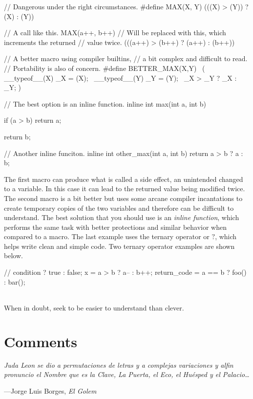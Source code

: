 \documentclass[11pt]{article}
\begin{document}
\begin{codelisting}{}
// Dangerous under the right circumstances.
#define MAX(X, Y) (((X) > (Y)) ? (X) : (Y))

// A call like this.
MAX(a++, b++)
// Will be replaced with this, which increments the returned
// value twice.
(((a++) > (b++) ? (a++) : (b++))

// A better macro using compiler builtins,
// a bit complex and difficult to read.
// Portability is also of concern.
#define BETTER_MAX(X,Y) \
    ({ __typeof__(X) _X = (X); \
     __typeof__(Y) _Y = (Y);  \
     _X > _Y ? _X : _Y; })

// The best option is an inline function.
inline int max(int a, int b) {
    if (a > b) {
        return a;
    }

    return b;
}

// Another inline funciton.
inline int other_max(int a, int b) {
    return a > b ? a : b;
}
\end{codelisting}

The first macro can produce what is called a side effect, an unintended changed
to a variable. In this case it can lead to the returned value being modified
twice.  The second macro is a bit better but uses some arcane compiler
incantations to create temporary copies of the two variables and therefore can
be difficult to understand. The best solution that you should use is an
\emph{inline function}, which performs the same task with better protections and
similar behavior when compared to a macro. The last example uses the ternary
operator or $?$, which helps write clean and simple code. Two ternary operator
examples are shown below.

\begin{codelisting}{}
// condition ? true : false;
x = a > b ? a-- : b++;
return_code = a == b ? foo() : bar();
\end{codelisting}\\

When in doubt, seek to be easier to understand than clever.


\section{Comments}

\textwidth
\epigraph{\emph{
Juda Leon se dio a permutaciones
de letras y a complejas variaciones
y alfin pronuncio el Nombre que es la Clave, La Puerta, el Eco, el Hu\'esped y
el Palacio\ldots}}{---Jorge Luis Borges, \emph{El Golem}}
\end{document}
